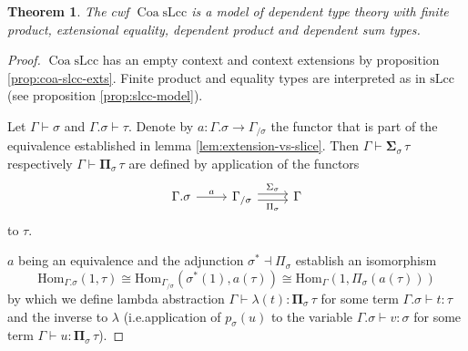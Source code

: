 \documentclass[a4paper]{article}
\newtheorem{theorem}{Theorem}
\theoremstyle{remark}
\theoremstyle{definition}
\begin{document}
\begin{theorem}
  \label{th:lcc-supports-types}
  The cwf $\operatorname{Coa} \mathrm{sLcc}$ is a model of dependent type theory with finite product, extensional equality, dependent product and dependent sum types.
\end{theorem}
\begin{proof}
  $\operatorname{Coa} \mathrm{sLcc}$ has an empty context and context extensions by proposition \ref{prop:coa-slcc-exts}.
  Finite product and equality types are interpreted as in $\mathrm{sLcc}$ (see proposition \ref{prop:slcc-model}).

  Let $\Gamma \vdash \sigma$ and $\Gamma.\sigma \vdash \tau$.
  Denote by $a : \Gamma.\sigma \rightarrow \Gamma_{/ \sigma}$ the functor that is part of the equivalence established in lemma \ref{lem:extension-vs-slice}.
  Then $\Gamma \vdash \mathbf{\Sigma}_\sigma \, \tau$ respectively $\Gamma \vdash \mathbf{\Pi}_\sigma \, \tau$ are defined by application of the functors
  \begin{equation}
    \begin{tikzcd}
      \Gamma.\sigma \arrow[r, "a"] & \Gamma_{/ \sigma} \arrow[r, shift left, "\Sigma_\sigma"] \arrow[r, shift right, "\Pi_\sigma"'] & \Gamma
    \end{tikzcd}
  \end{equation}
  to $\tau$.

  $a$ being an equivalence and the adjunction $\sigma^* \dashv \Pi_\sigma$ establish an isomorphism
  \begin{equation}
    \mathrm{Hom}_{\Gamma.\sigma}(1, \tau) \cong \mathrm{Hom}_{\Gamma_{/ \sigma}}(\sigma^*(1), a(\tau)) \cong \mathrm{Hom}_{\Gamma}(1, \Pi_\sigma(a(\tau)))
  \end{equation}
  by which we define lambda abstraction $\Gamma \vdash \lambda(t) : \mathbf{\Pi}_\sigma \, \tau$ for some term $\Gamma.\sigma \vdash t : \tau$ and the inverse to $\lambda$ (i.e.\@ application of $p_\sigma(u)$ to the variable $\Gamma.\sigma \vdash v : \sigma$ for some term $\Gamma \vdash u : \mathbf{\Pi}_\sigma \, \tau$).


\end{proof}
\end{document}
